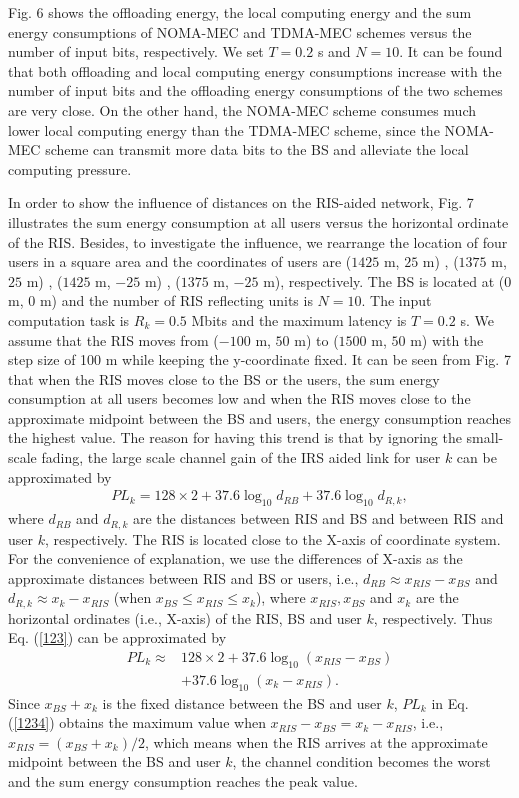 \documentclass[journal]{IEEEtran}
\begin{document}
Fig. 6 shows the offloading energy, the local computing energy and the sum energy consumptions of NOMA-MEC and TDMA-MEC schemes versus the number of input bits, respectively. We set $T=0.2$ s and $N=10$.
It can be found that both offloading and local computing energy consumptions increase with the number of input bits and the offloading energy consumptions of the two schemes are very close.
On the other hand, the NOMA-MEC scheme consumes much lower local computing energy than the TDMA-MEC scheme, since the NOMA-MEC scheme can transmit more data bits to the BS and alleviate the local computing pressure.

{In order to show the influence of distances on the RIS-aided network, Fig. 7 illustrates the sum energy consumption at all users versus the horizontal ordinate of the RIS. Besides, to investigate the influence, we rearrange the location of four users in a square area and the coordinates of users are ($1425$ m, $25$ m) , ($1375$ m, $25$ m) , ($1425$ m, $-25$ m) , ($1375$ m, $-25$ m), respectively. The BS is located at ($0$ m, $0$ m) and the number of RIS reflecting units is $N=10$. The input computation task is $R_k=0.5$ Mbits and the maximum latency is $T=0.2$ s. We assume that the RIS moves from ($-100$ m, $50$ m) to ($1500$ m, $50$ m) with the step size of 100 m while keeping the y-coordinate fixed. It can be seen from Fig. 7 that when the RIS moves close to the BS or the users, the sum energy consumption at all users becomes low and when the RIS moves close to the approximate midpoint between the BS and users, the energy consumption reaches the highest value. The reason for having this trend is that by ignoring the small-scale fading, the large scale channel gain of the IRS aided link for user $k$ can be approximated by
\begin{align} \label{123}
	PL_k=128\times2+37.6\log_{10}d_{RB}+37.6\log_{10}d_{R,k},
\end{align}
where $d_{RB}$ and $d_{R,k}$ are the distances between RIS and BS and between RIS and user $k$, respectively.
The RIS is located close to the X-axis of coordinate system. For the convenience of explanation, we use the differences of X-axis as the approximate distances between RIS and BS or users, i.e., $d_{RB}\approx x_{RIS}-x_{BS}$ and $d_{R,k}\approx x_{k}-x_{RIS}$ (when $x_{BS}\leq x_{RIS}\leq x_{k}$), where $x_{RIS},x_{BS}$ and $x_{k}$ are the horizontal ordinates (i.e., X-axis) of the RIS, BS and user $k$, respectively. Thus Eq. (\ref{123}) can be approximated by
\begin{align} \label{1234}
	PL_k\approx &128\times2+37.6\log_{10}(x_{RIS}-x_{BS})\\\nonumber&+37.6\log_{10}(x_{k}-x_{RIS}).
\end{align}
Since $x_{BS}+x_{k}$ is the fixed distance between the BS and user $k$, $PL_k$ in Eq. (\ref{1234}) obtains the maximum value when $x_{RIS}-x_{BS}=x_{k}-x_{RIS}$, i.e., $x_{RIS}=(x_{BS}+x_{k})/2$, which means when the RIS arrives at the approximate midpoint between the BS and user $k$, the channel condition becomes the worst and the sum energy consumption reaches the peak value.}
\end{document}
